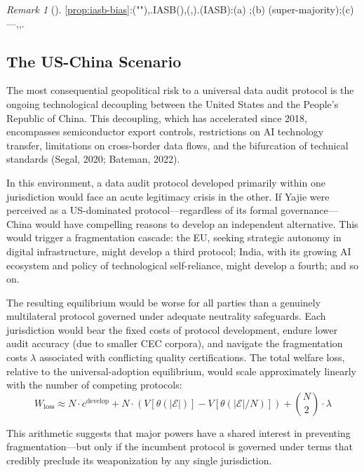 \documentclass[12pt,a4paper]{article}
\theoremstyle{definition}
\theoremstyle{remark}
\newtheorem{remark}{Remark}[section]
\begin{document}
\begin{remark}[]
\ref{prop:iasb-bias}:(""),.IASB(),(,).(IASB):(a) ;(b) (super-majority);(c) ---,,.
\end{remark}

\subsection{The US-China Scenario}

The most consequential geopolitical risk to a universal data audit protocol is the ongoing technological decoupling between the United States and the People's Republic of China. This decoupling, which has accelerated since 2018, encompasses semiconductor export controls, restrictions on AI technology transfer, limitations on cross-border data flows, and the bifurcation of technical standards (Segal, 2020; Bateman, 2022).

In this environment, a data audit protocol developed primarily within one jurisdiction would face an acute legitimacy crisis in the other. If Yajie were perceived as a US-dominated protocol—regardless of its formal governance—China would have compelling reasons to develop an independent alternative. This would trigger a fragmentation cascade: the EU, seeking strategic autonomy in digital infrastructure, might develop a third protocol; India, with its growing AI ecosystem and policy of technological self-reliance, might develop a fourth; and so on.

The resulting equilibrium would be worse for all parties than a genuinely multilateral protocol governed under adequate neutrality safeguards. Each jurisdiction would bear the fixed costs of protocol development, endure lower audit accuracy (due to smaller CEC corpora), and navigate the fragmentation costs $\lambda$ associated with conflicting quality certifications. The total welfare loss, relative to the universal-adoption equilibrium, would scale approximately linearly with the number of competing protocols:
\begin{equation}
W_{\text{loss}} \approx N \cdot c^{\text{develop}} + N \cdot (V[\theta(|\mathcal{E}|)] - V[\theta(|\mathcal{E}|/N)]) + \binom{N}{2} \cdot \lambda
\end{equation}

This arithmetic suggests that major powers have a shared interest in preventing fragmentation—but only if the incumbent protocol is governed under terms that credibly preclude its weaponization by any single jurisdiction.
\end{document}
